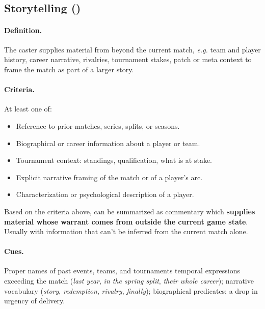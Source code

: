\begin{agexample}
\\[2pt]
\\[2pt]
\end{agexample}

\subsection{Storytelling (\cSTO{})}
\label{sec:def-sto}

\paragraph{Definition.} The caster supplies material from beyond the current match, \textit{e.g.} team and player history, career narrative, rivalries, tournament stakes, patch or meta context to frame the match as part of a larger story.

\paragraph{Criteria.} At least one of:
\begin{itemize}
  \item Reference to prior matches, series, splits, or seasons.
  \item Biographical or career information about a player or team.
  \item Tournament context: standings, qualification, what is at stake.
  \item Explicit narrative framing of the match or of a player's arc.
  \item Characterization or psychological description of a player.
\end{itemize}

\begin{agrulebox}
  Based on the criteria above, \STO{} can be summarized as commentary which \textbf{supplies material whose warrant comes from outside the current game state}. Usually with information that can't be inferred from the current match alone.
\end{agrulebox}

\paragraph{Cues.} Proper names of past events, teams, and tournaments temporal expressions exceeding the match (\emph{last year}, \emph{in the spring split}, \emph{their whole career}); narrative vocabulary (\emph{story}, \emph{redemption}, \emph{rivalry}, \emph{finally}); biographical predicates; a drop in urgency of delivery.

